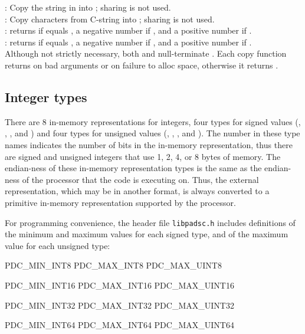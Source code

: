 : Copy the string in  into ; sharing is not used.\\[1ex]
: Copy  characters from C-string  into ; sharing is not used.\\[1ex]
: returns  if  equals , a negative number if ,
and a positive number if .\\[1ex]
: returns  if  equals , a negative number if ,
and a positive number if .\\[1ex]

Although not strictly necessary, both  and  null-terminate .
Each copy function returns  on bad arguments or on failure to alloc space, otherwise it returns .

\subsection{Integer types}

There are 8 in-memory representations for integers, four types for
signed values (, , , and )
and four types for unsigned values (, , , and ).
The number in these type names indicates the number of bits in the in-memory representation,
thus there are signed and unsigned integers that use 1, 2, 4, or 8 bytes of memory.
The endian-ness of these in-memory representation types is the same as the
endian-ness of the processor that the code is executing on.  Thus,
the external representation, which may be in another format, is always converted
to a primitive in-memory representation supported by the processor.

For programming convenience, the header file {\tt libpadsc.h} includes definitions of the minimum
and maximum values for each signed type, and of the maximum value for each unsigned type:
\begin{tinycode}
PDC_MIN_INT8
PDC_MAX_INT8
PDC_MAX_UINT8

PDC_MIN_INT16
PDC_MAX_INT16
PDC_MAX_UINT16

PDC_MIN_INT32
PDC_MAX_INT32
PDC_MAX_UINT32

PDC_MIN_INT64
PDC_MAX_INT64
PDC_MAX_UINT64
\end{tinycode}

